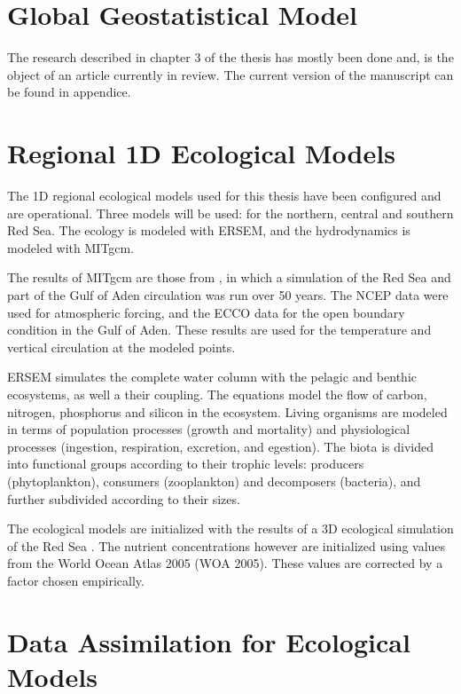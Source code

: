 \section{Global Geostatistical Model}

The research described in chapter 3 of the thesis has mostly been done and, is
the object of an article currently in review. The current version of the
manuscript can be found in appendice.

\section{Regional 1D Ecological Models}

The 1D regional ecological models used for this thesis have been configured
and are operational. Three models will be used: for the northern, central and 
southern Red Sea. The ecology is modeled with ERSEM, and the hydrodynamics
is modeled with MITgcm.

The results of MITgcm are those from \citet{Yao2014, Yao2014b}, in which a
simulation of the Red Sea and part of the Gulf of Aden circulation was run over
50 years. The NCEP data were used for atmospheric forcing, and the ECCO data
for the open boundary condition in the Gulf of Aden. These results are used for
the temperature and vertical circulation at the modeled points.

ERSEM simulates the complete water column with the pelagic and benthic
ecosystems, as well a their coupling. The equations model the flow of carbon,
nitrogen, phosphorus and silicon in the ecosystem. Living organisms are modeled
in terms of population processes (growth and mortality) and physiological
processes (ingestion, respiration, excretion, and egestion). The biota is
divided into functional groups according to their trophic levels: producers
(phytoplankton), consumers (zooplankton) and decomposers (bacteria), and
further subdivided according to their sizes.

The ecological models are initialized with the results of a 3D ecological
simulation of the Red Sea \citep{Triantafyllou2014}. The nutrient
concentrations however are initialized using values from the World Ocean Atlas
2005 (WOA 2005). These values are corrected by a factor chosen empirically.

\section{Data Assimilation for Ecological Models}

